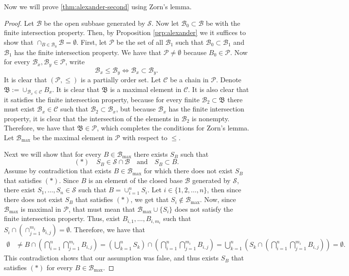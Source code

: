 \documentclass[11pt,a4paper]{article}
\theoremstyle{definition}
\theoremstyle{plain}
\newcommand{\tand}{\quad \text{and} \quad}
\begin{document}
  Now we will prove \autoref{thm:alexander-second} using Zorn's lemma.

  \begin{proof}
    Let $\mathcal B$ be the open subbase generated by $\mathcal S$.
    Now let $\mathcal B_0 \subset \mathcal B$ be with the finite intersection
    property. Then, by Proposition \ref{prp:alexander} we it suffices to
    show that $\cap_{B \in \mathcal B_0} \mathcal B = \emptyset$.
    First, let $\mathcal P$ be the set of all $\mathcal B_1$ such that
    $\mathcal B_0 \subset \mathcal B_1$ and $\mathcal B_1$ has the finite
    intersection property. We have that $\mathcal P \neq \emptyset$ because
    $B_0 \in \mathcal P$. Now for every 
    $\mathcal B_x, \mathcal B_y \in \mathcal P$, write
    \[
      \mathcal B_x \le \mathcal B_y \iff
      \mathcal B_x \subset \mathcal B_y.
    \]
    It is clear that $(\mathcal P, \le)$ is a partially order set.
    Let $\mathcal C$ be a chain in $\mathcal P$.
    Denote $\mathfrak B := \cup_{\mathcal B_x \in \mathcal C} B_x$.
    It is clear that $\mathfrak B$ is a maximal element in $\mathcal C$.
    It is also clear that it satisfies the finite intersection property,
    because for every finite $\mathcal B_2 \subset \mathfrak B$ there
    must exist $\mathcal B_x \in \mathcal C$ such that 
    $\mathcal B_2 \subset \mathcal B_x$, but because $\mathcal B_x$ has
    the finite intersection property, it is clear that the intersection
    of the elements in $\mathcal B_2$ is nonempty.
    Therefore, we have that $\mathfrak B \in \mathcal P$, which completes
    the conditions for Zorn's lemma.
    Let $\mathcal B_{\max}$ be the maximal element in $\mathcal P$ with
    respect to $\le$.

    Next we will show that for every $B \in \mathcal B_{\max}$ there exists
    $S_B$ such that
    \[
      (*) \quad S_B \in \mathcal S \cap \mathcal B \tand S_B \subset B.
    \]
    Assume by contradiction that exists $B \in \mathcal B_{\max}$ for which
    there does not exist $S_B$ that satisfies $(*)$. Since $B$ is an element
    of the closed base $\mathcal B$ generated by $\mathcal S$, there exist
    $S_1,\dots,S_n \in \mathcal S$ such that $B = \cup_{i=1}^{n} S_i$.
    Let $i \in \{1,2,\dots,n\}$, then since there does not exist $S_B$ that 
    satisfies $(*)$, we get that $S_i \notin \mathcal B_{\max}$.
    Now, since $\mathcal B_{\max}$ is maximal in $\mathcal P$, that must
    mean that $\mathcal B_{\max} \cup \{S_i\}$ does not satisfy the finite
    intersection property.
    Thus, exist $B_{i,1},\dots,B_{i,m_i}$ such that
    $S_i \cap \left(\cap_{j=1}^{m_i} b_{i,j}\right) = \emptyset$.
    Therefore, we have that
    \begin{align*}
      \emptyset 
      &\neq
      B \cap \left(\bigcap_{i=1}^{n} \bigcap_{j=1}^{m_i} B_{i,j}\right) =
      \left(\bigcup_{k=1}^{n} S_k\right) \cap
         \left(\bigcap_{i=1}^{n} \bigcap_{j=1}^{m_i} B_{i,j}\right) =
      \bigcup_{k=1}^{n} 
      \left(S_k \cap 
      \left(\bigcap_{i=1}^{n} \bigcap_{j=1}^{m_i} B_{i,j}\right)\right)
      = \emptyset.
    \end{align*}
    This contradiction shows that our assumption was false, and thus
    exists $S_B$ that satisfies $(*)$ for every $B \in \mathcal B_{\max}$.


\end{proof}
\end{document}

